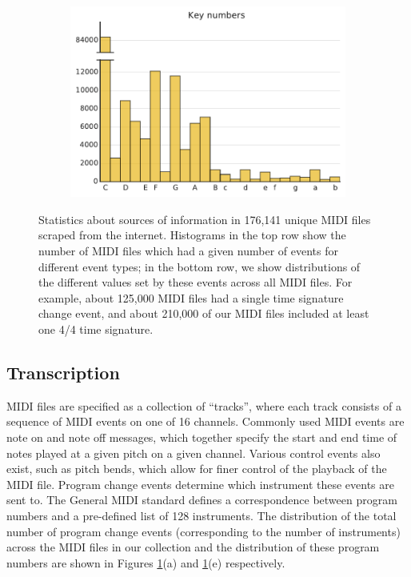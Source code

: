 \documentclass{article}
\begin{document}
\begin{figure}
\begin{subfigure}{.23\textwidth}
    \end{subfigure}
    \begin{subfigure}{.23\textwidth}
        \includegraphics[width=\textwidth]{keys.pdf}
    \end{subfigure}
    \caption{Statistics about sources of information in 176,141 unique MIDI files scraped from the internet.
    Histograms in the top row show the number of MIDI files which had a given number of events for different event types; in the bottom row, we show distributions of the different values set by these events across all MIDI files.
    For example, about 125,000 MIDI files had a single time signature change event, and about 210,000 of our MIDI files included at least one 4/4 time signature.}
    \label{fig:statistics}
\end{figure}

\subsection{Transcription}

MIDI files are specified as a collection of ``tracks'', where each track consists of a sequence of MIDI events on one of 16 channels.
Commonly used MIDI events are note on and note off messages, which together specify the start and end time of notes played at a given pitch on a given channel.
Various control events also exist, such as pitch bends, which allow for finer control of the playback of the MIDI file.
Program change events determine which instrument these events are sent to.
The General MIDI standard defines a correspondence between program numbers and a pre-defined list of 128 instruments.
The distribution of the total number of program change events (corresponding to the number of instruments) across the MIDI files in our collection and the distribution of these program numbers are shown in Figures \ref{fig:statistics}(a) and \ref{fig:statistics}(e) respectively.
\end{document}
